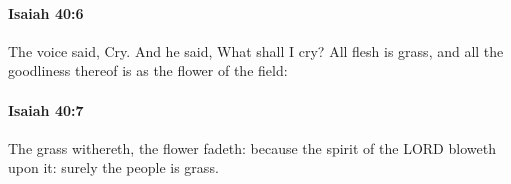 		\paragraph{Isaiah 40:6} %
			\label{ISAIAH-40-6}

			The voice said, Cry. And he said, What shall I cry? All flesh is grass, and all the goodliness thereof is as the flower of the field:


		\paragraph{Isaiah 40:7} %
			\label{ISAIAH-40-7}

			The grass withereth, the flower fadeth: because the spirit of the LORD bloweth upon it: surely the people is grass.


